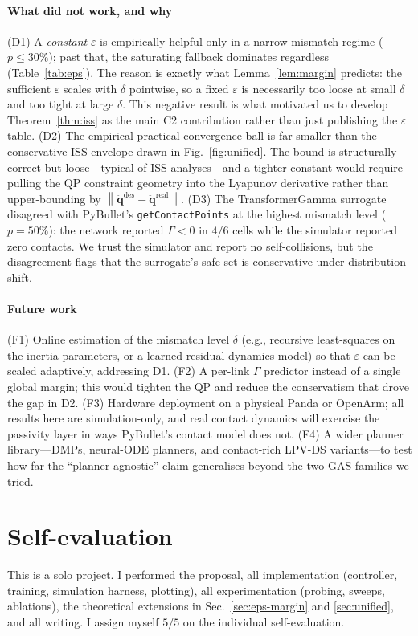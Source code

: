 \documentclass[10pt,conference]{IEEEtran}
\newcommand{\bddq}{\ddot{\bm{q}}}
\newcommand{\norm}[1]{\left\lVert #1 \right\rVert}
\theoremstyle{remark}
\theoremstyle{plain}
\begin{document}
\paragraph*{What did not work, and why} (D1) A \emph{constant}
$\varepsilon$ is empirically helpful only in a narrow mismatch
regime ($p\!\le\!30\%$); past that, the saturating fallback
dominates regardless (Table~\ref{tab:eps}). The reason is exactly
what Lemma~\ref{lem:margin} predicts: the sufficient
$\varepsilon$ scales with $\delta$ pointwise, so a fixed
$\varepsilon$ is necessarily too loose at small $\delta$ and too
tight at large $\delta$. This negative result is what motivated
us to develop Theorem~\ref{thm:iss} as the main C2 contribution
rather than just publishing the $\varepsilon$ table.
(D2) The empirical practical-convergence ball is far smaller than
the conservative ISS envelope drawn in Fig.~\ref{fig:unified}.
The bound is structurally correct but loose---typical of ISS
analyses---and a tighter constant would require pulling the QP
constraint geometry into the Lyapunov derivative rather than
upper-bounding by $\norm{\bddq^{\text{des}}-\bddq^{\text{real}}}$.
(D3) The TransformerGamma surrogate disagreed with PyBullet's
\texttt{getContactPoints} at the highest mismatch level
($p{=}50\%$): the network reported $\Gamma{<}0$ in $4/6$ cells
while the simulator reported zero contacts. We trust the
simulator and report no self-collisions, but the disagreement
flags that the surrogate's safe set is conservative under
distribution shift.

\paragraph*{Future work} (F1) Online estimation of the mismatch
level $\delta$ (e.g., recursive least-squares on the inertia
parameters, or a learned residual-dynamics model) so that
$\varepsilon$ can be scaled adaptively, addressing D1.
(F2) A per-link $\Gamma$ predictor instead of a single global
margin; this would tighten the QP and reduce the conservatism
that drove the gap in D2.
(F3) Hardware deployment on a physical Panda or OpenArm; all
results here are simulation-only, and real contact dynamics
will exercise the passivity layer in ways PyBullet's contact
model does not.
(F4) A wider planner library---DMPs, neural-ODE planners, and
contact-rich LPV-DS variants---to test how far the
``planner-agnostic'' claim generalises beyond the two GAS
families we tried.

\section*{Self-evaluation}
This is a solo project. I performed the proposal, all
implementation (controller, training, simulation harness,
plotting), all experimentation (probing, sweeps, ablations), the
theoretical extensions in Sec.~\ref{sec:eps-margin} and
\ref{sec:unified}, and all writing. I assign myself $5/5$ on the
individual self-evaluation.
\end{document}
